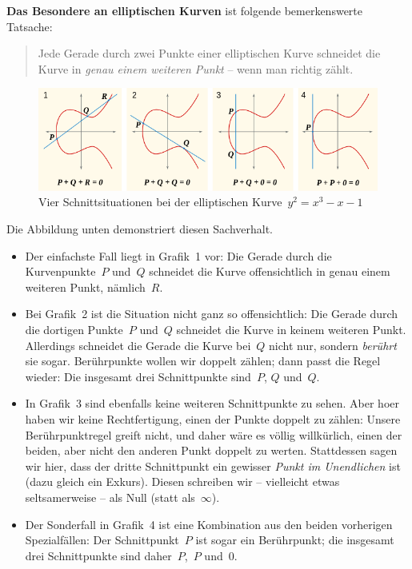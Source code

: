 \documentclass{zirkelblatt}
\begin{document}
\textbf{Das Besondere an elliptischen Kurven} ist folgende bemerkenswerte Tatsache:
\begin{quote}
Jede Gerade durch zwei Punkte einer elliptischen Kurve schneidet die Kurve in
\emph{genau einem weiteren Punkt} -- wenn man richtig zählt.
\end{quote}
\begin{figure}[b]
  \centering
  \includegraphics[scale=0.6]{elliptic-curve-r}
  \caption{Vier Schnittsituationen bei der elliptischen Kurve~$y^2 = x^3 - x - 1$}
\end{figure}
Die Abbildung unten demonstriert diesen Sachverhalt.
\begin{itemize}
\item Der einfachste Fall liegt
in Grafik~1 vor: Die Gerade durch die Kurvenpunkte~$P$ und~$Q$ schneidet die
Kurve offensichtlich in genau einem weiteren Punkt, nämlich~$R$.
\item Bei Grafik~2
ist die Situation nicht ganz so offensichtlich: Die Gerade durch die dortigen
Punkte~$P$ und~$Q$ schneidet die Kurve in keinem weiteren Punkt. Allerdings
schneidet die Gerade die Kurve bei~$Q$ nicht nur, sondern \emph{berührt} sie
sogar. Berührpunkte wollen wir doppelt zählen; dann passt die Regel wieder: Die
insgesamt drei Schnittpunkte sind~$P$, $Q$ und~$Q$.
\item In Grafik~3 sind ebenfalls keine weiteren Schnittpunkte zu sehen. Aber
hoer haben wir keine Rechtfertigung, einen der Punkte doppelt zu zählen: Unsere
Berührpunktregel greift nicht, und daher wäre es völlig willkürlich, einen der
beiden, aber nicht den anderen Punkt doppelt zu werten. Stattdessen sagen wir hier,
dass der dritte Schnittpunkt ein gewisser \emph{Punkt im Unendlichen} ist (dazu
gleich ein Exkurs).
Diesen schreiben wir -- vielleicht etwas seltsamerweise -- als Null (statt
als~$\infty$).
\item Der Sonderfall in Grafik~4 ist eine Kombination aus den beiden vorherigen
Spezialfällen: Der Schnittpunkt~$P$ ist sogar ein Berührpunkt; die insgesamt
drei Schnittpunkte sind daher~$P$,~$P$ und~$0$.
\end{itemize}
\end{document}
